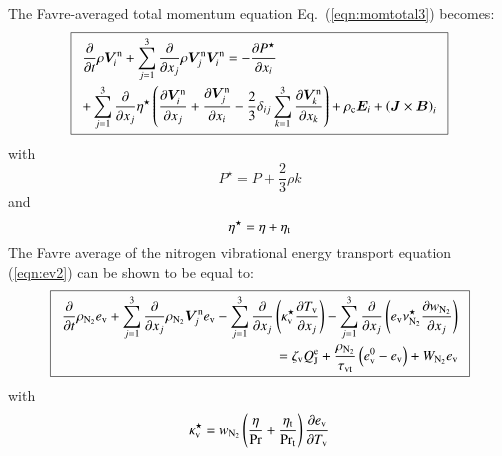 \documentclass{warpdoc}
\newcommand\frameeqn[1]{\fbox{$\displaystyle #1$}}
\newcommand{\alb}{\vspace{0.1cm}\\} %
\newcommand{\mfd}{\displaystyle}
\newcommand{\ev}{{e_{\rm v}}}
\newcommand{\evzero}{{e_{\rm v}^0}}
\newcommand{\kappaev}{\kappa_{{\rm v}}}
\newcommand{\visc}{\eta}
\newcommand{\tauvt}{\tau_{\rm vt}}
\renewcommand{\vec}[1]{\bm{#1}}
\begin{document}
The Favre-averaged total momentum equation Eq.\ (\ref{eqn:momtotal3}) becomes:
%
\begin{equation}
\frameeqn{
\begin{array}{l}\mfd
   \frac{\partial  }{\partial t}\rho \vec{V}_i^{\rm n}
  + \sum_{j=1}^3  \frac{\partial }{\partial x_j}\rho \vec{V}_j^{\rm n} \vec{V}_i^{\rm n}
=
-\frac{\partial P^\star}{\partial x_i}\alb\mfd 
+ \sum_{j=1}^3 \frac{\partial }{\partial x_j} \visc^\star  \left( \frac{\partial \vec{V}^{\rm n}_i}{\partial x_j} + \frac{\partial \vec{V}^{\rm n}_j}{\partial x_i} - \frac{2}{3} \delta_{ij} \sum_{k=1}^3 \frac{\partial \vec{V}^{\rm n}_k}{\partial x_k}  \right)
+ \rho_{\rm c} \vec{E}_i +\left(\vec{J} \times \vec{B}\right)_i
\end{array}
}
\label{eqn:momtotal_turb}
\end{equation}
%
with
%
\begin{equation}
P^\star=P + \frac{2}{3} \rho k
\end{equation}
%
and
%
\begin{equation}
 \visc^\star=\visc+\visc_{\rm t}
\end{equation}
%
The Favre average of the nitrogen vibrational energy transport equation (\ref{eqn:ev2}) can be shown to be equal to:
%
\begin{equation}
\frameeqn{
 \begin{array}{r}
  \mfd\frac{\partial}{\partial t} \rho_{\rm N_2} \ev
     + \sum_{j=1}^{3} \frac{\partial }{\partial x_j}
       \rho_{\rm N_2} \vec{V}^{\rm n}_j \ev
     - \sum_{j=1}^{3} \frac{\partial }{\partial x_j} \left(
            \kappaev^\star  \frac{\partial T_{\rm v}}{\partial x_j}\right)
     - \sum_{j=1}^{3} \frac{\partial }{\partial x_j} \left(
            \ev \nu_{\rm N_2}^\star  \frac{\partial w_{\rm N_2}}{\partial x_j}\right)\alb\mfd
 = 
 \zeta_{\rm v} Q_{\rm J}^{\rm e}   + {\frac{\rho_{\rm N_2}}{\tauvt}}\left( \evzero-\ev \right) + W_{\rm N_2} \ev
\end{array}
}
\label{eqn:ev_turb}
\end{equation}
%
with 
%
\begin{equation}
\kappaev^\star=w_{\rm N_2} \left( \frac{\visc}{\rm Pr}+\frac{\visc_{\rm t}}{\rm Pr_t}  \right)\frac{\partial \ev}{\partial T_{\rm v}}
\end{equation}
%
\end{document}
